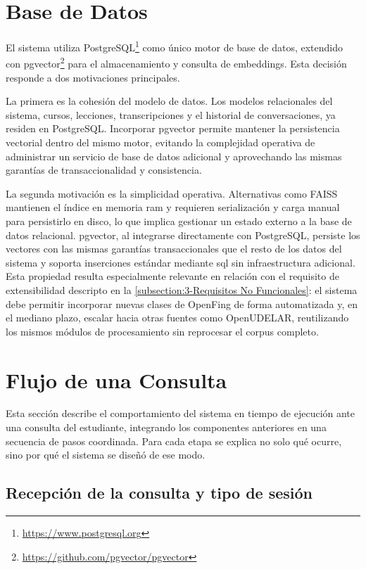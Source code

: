 \section{Base de Datos}
\label{section:4-Base de Datos}
El sistema utiliza PostgreSQL\footnote{\url{https://www.postgresql.org}} como único motor de base de datos, extendido con pgvector\footnote{\url{https://github.com/pgvector/pgvector}} para el almacenamiento y consulta de embeddings. Esta decisión responde a dos motivaciones principales.

La primera es la cohesión del modelo de datos. Los modelos relacionales del sistema, cursos, lecciones, transcripciones y el historial de conversaciones, ya residen en PostgreSQL. Incorporar pgvector permite mantener la persistencia vectorial dentro del mismo motor, evitando la complejidad operativa de administrar un servicio de base de datos adicional y aprovechando las mismas garantías de transaccionalidad y consistencia.

La segunda motivación es la simplicidad operativa. Alternativas como FAISS \cite{douze2025faiss} mantienen el índice en memoria \acrshort{ram} y requieren serialización y carga manual para persistirlo en disco, lo que implica gestionar un estado externo a la base de datos relacional. pgvector, al integrarse directamente con PostgreSQL, persiste los vectores con las mismas garantías transaccionales que el resto de los datos del sistema y soporta inserciones estándar mediante \acrshort{sql} sin infraestructura adicional. Esta propiedad resulta especialmente relevante en relación con el requisito de extensibilidad descripto en la \autoref{subsection:3-Requisitos No Funcionales}: el sistema debe permitir incorporar nuevas clases de OpenFing de forma automatizada y, en el mediano plazo, escalar hacia otras fuentes como OpenUDELAR, reutilizando los mismos módulos de procesamiento sin reprocesar el corpus completo.

\section{Flujo de una Consulta}
\label{section:4-Flujo de una Consulta}

Esta sección describe el comportamiento del sistema en tiempo de ejecución ante una consulta del estudiante, integrando los componentes anteriores en una secuencia de pasos coordinada. Para cada etapa se explica no solo qué ocurre, sino por qué el sistema se diseñó de ese modo.

\subsection{Recepción de la consulta y tipo de sesión}
\label{subsection:4-Recepcion}

